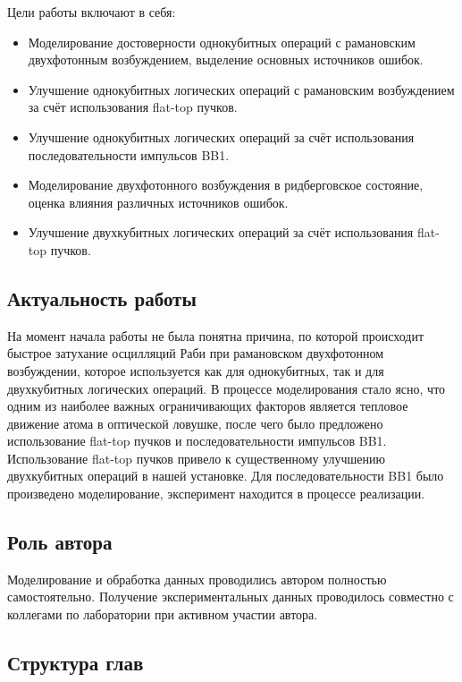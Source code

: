 Цели работы включают в себя:

\begin{itemize}
	\item Моделирование достоверности однокубитных операций с рамановским двухфотонным возбуждением, выделение основных источников ошибок.

	\item Улучшение однокубитных логических операций с рамановским возбуждением за счёт использования flat-top пучков. 

	\item Улучшение однокубитных логических операций за счёт использования последовательности импульсов BB1.

	\item Моделирование двухфотонного возбуждения в ридберговское состояние, оценка влияния различных источников ошибок.

	\item Улучшение двухкубитных логических операций за счёт использования flat-top пучков. 
\end{itemize}

\subsection{Актуальность работы}

На момент начала работы не была понятна причина, по которой происходит быстрое затухание осцилляций Раби при рамановском двухфотонном возбуждении, которое используется как для однокубитных, так и для двухкубитных логических операций. В процессе моделирования стало ясно, что одним из наиболее важных ограничивающих факторов является тепловое движение атома в оптической ловушке, после чего было предложено использование flat-top пучков и последовательности импульсов BB1. Использование flat-top пучков привело к существенному улучшению двухкубитных операций в нашей установке. Для последовательности BB1 было произведено моделирование, эксперимент находится в процессе реализации.

\subsection{Роль автора}

Моделирование и обработка данных проводились автором полностью самостоятельно. Получение экспериментальных данных проводилось совместно с коллегами по лаборатории при активном участии автора. 

\subsection{Структура глав} 

